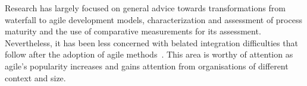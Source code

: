 Research has largely focused on general advice towards transformations from waterfall to agile development models, characterization and assessment of process maturity and the use of comparative measurements for its assessment. Nevertheless, it has been less concerned with belated integration difficulties that follow after the adoption of agile methods~\citep{ivari2011orgagile}. This area is worthy of attention as agile's popularity increases and gains attention from organisations of different context and size.
